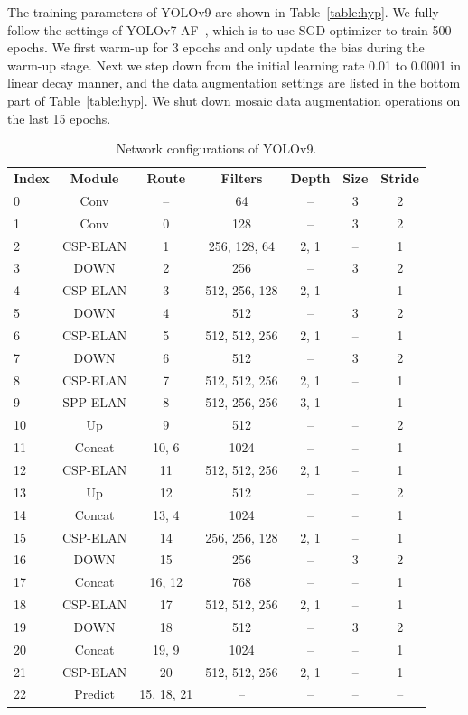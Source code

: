 \documentclass[10pt,twocolumn,letterpaper]{article}
\begin{document}
	The training parameters of YOLOv9 are shown in Table~\ref{table:hyp}.  We fully follow the settings of YOLOv7 AF~\cite{wang2023yolov7}, which is to use SGD optimizer to train 500 epochs.  We first warm-up for 3 epochs and only update the bias during the warm-up stage.  Next we step down from the initial learning rate 0.01 to 0.0001 in linear decay manner, and the data augmentation settings are listed in the bottom part of Table~\ref{table:hyp}.  We shut down mosaic data augmentation operations on the last 15 epochs.
	
	\newpage
	
	\begin{table}[h]
		\centering
		\begin{threeparttable}[h]
			\small
			\caption{Network configurations of YOLOv9.}
			\label{table:cfg}
			\setlength\tabcolsep{1.0pt}
			\begin{tabular}{lcccccc}
				\toprule
				\textbf{Index} & \textbf{Module} & \textbf{Route} & \textbf{Filters} & \textbf{Depth} & \textbf{Size} & \textbf{Stride} \\	
				0 & Conv & -- & 64 & -- & 3 & 2 \\	
				1 & Conv & 0 & 128 & -- & 3 & 2 \\	
				2 & CSP-ELAN & 1 & 256, 128, 64 & 2, 1 & -- & 1 \\	
				3 & DOWN & 2 & 256 & -- & 3 & 2 \\	
				4 & CSP-ELAN & 3 & 512, 256, 128 & 2, 1 & -- & 1 \\	
				5 & DOWN & 4 & 512 & -- & 3 & 2 \\
				6 & CSP-ELAN & 5 & 512, 512, 256 & 2, 1 & -- & 1 \\	
				7 & DOWN & 6 & 512 & -- & 3 & 2 \\
				8 & CSP-ELAN & 7 & 512, 512, 256 & 2, 1 & -- & 1 \\		
				9 & SPP-ELAN & 8 & 512, 256, 256 & 3, 1 & -- & 1 \\	
				10 & Up & 9 & 512 & -- & -- & 2 \\	
				11 & Concat & 10, 6 & 1024 & -- & -- & 1 \\	
				12 & CSP-ELAN & 11 & 512, 512, 256 & 2, 1 & -- & 1 \\	
				13 & Up & 12 & 512 & -- & -- & 2 \\	
				14 & Concat & 13, 4 & 1024 & -- & -- & 1 \\
				15 & CSP-ELAN & 14 & 256, 256, 128 & 2, 1 & -- & 1 \\	
				16 & DOWN & 15 & 256 & -- & 3 & 2 \\	
				17 & Concat & 16, 12 & 768 & -- & -- & 1 \\	
				18 & CSP-ELAN & 17 & 512, 512, 256 & 2, 1 & -- & 1 \\	
				19 & DOWN & 18 & 512 & -- & 3 & 2 \\	
				20 & Concat & 19, 9 & 1024 & -- & -- & 1 \\
				21 & CSP-ELAN & 20 & 512, 512, 256 & 2, 1 & -- & 1 \\	
				22 & Predict & 15, 18, 21 & -- & -- & -- & -- \\	
				\bottomrule
			\end{tabular}
		\end{threeparttable}
	\end{table}
	
\end{document}

